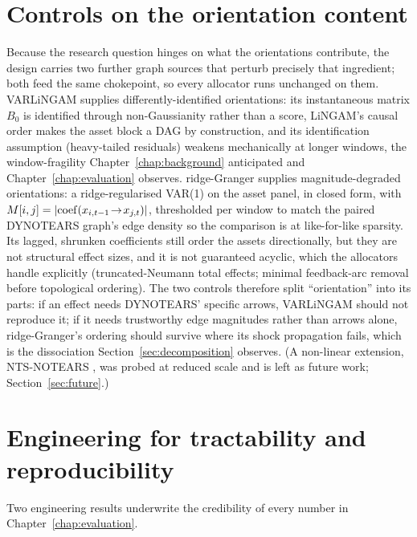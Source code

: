 \section{Controls on the orientation content}
\label{sec:comparators}

Because the research question hinges on what the orientations contribute, the design
carries two further graph sources that perturb precisely that ingredient;
both feed the same chokepoint, so every allocator runs unchanged on them.
VARLiNGAM \cite{hyvarinen2010varlingam} supplies
differently-identified orientations: its instantaneous matrix $B_0$
is identified through non-Gaussianity rather than a score, LiNGAM's causal
order makes the asset block a DAG by construction, and its identification
assumption (heavy-tailed residuals) weakens mechanically at longer
windows, the window-fragility Chapter~\ref{chap:background} anticipated and
Chapter~\ref{chap:evaluation} observes. ridge-Granger supplies
magnitude-degraded orientations: a ridge-regularised VAR(1) on the
asset panel, in closed form, with
$M[i,j] = |{\rm coef}(x_{i,t-1}\!\to\!x_{j,t})|$, thresholded per window
to match the paired DYNOTEARS graph's edge density so the comparison is at
like-for-like sparsity. Its lagged, shrunken coefficients still order the
assets directionally, but they are not structural effect sizes, and it
is not guaranteed acyclic, which the allocators handle explicitly
(truncated-Neumann total effects; minimal feedback-arc removal before
topological ordering). The two controls therefore split ``orientation''
into its parts: if an effect needs DYNOTEARS' specific arrows, VARLiNGAM
should not reproduce it; if it needs trustworthy edge magnitudes
rather than arrows alone, ridge-Granger's ordering should survive where its
shock propagation fails, which is the dissociation
Section~\ref{sec:decomposition} observes. (A non-linear extension,
NTS-NOTEARS \cite{sun2023ntsnotears}, was probed at reduced scale and
is left as future work; Section~\ref{sec:future}.)

\section{Engineering for tractability and reproducibility}
\label{sec:cache}

Two engineering results underwrite the credibility of every number in
Chapter~\ref{chap:evaluation}.

